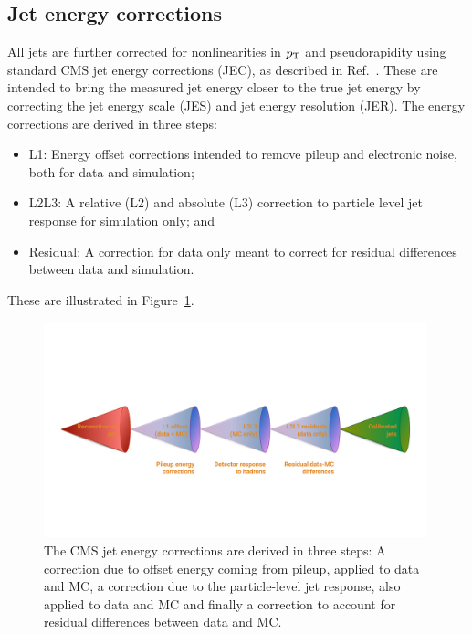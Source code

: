 \subsection{Jet energy corrections}
\label{sec:objreco:jec}
All jets are further corrected for nonlinearities in $p_{\mathrm{T}}$ and pseudorapidity using standard CMS jet energy corrections (JEC), as described in Ref.~\cite{jme_jinst}. These are intended to bring the measured jet energy closer to the true jet energy by correcting the jet energy scale (JES) and jet energy resolution (JER). The energy corrections are derived in three steps:
\begin{itemize}
  \itemsep0em 
  \item L1: Energy offset corrections intended to remove pileup and electronic noise, both for data and simulation;
  \item L2L3: A relative (L2) and absolute (L3) correction to particle level jet response for simulation only; and
  \item Residual: A correction for data only meant to correct for residual differences between data and simulation.
\end{itemize}
These are illustrated in Figure~\ref{fig:objreco:jec}.
\begin{figure}[h!]
    \centering
    \includegraphics[width=0.99\textwidth]{figures/event_reconstruction/JEC.pdf}
    \caption{The CMS jet energy corrections are derived in three steps: A correction due to offset energy coming from pileup, applied to data and MC, a correction due to the particle-level jet response, also applied to data and MC and finally a correction to account for residual differences between data and MC.}
    \label{fig:objreco:jec}
\end{figure}


